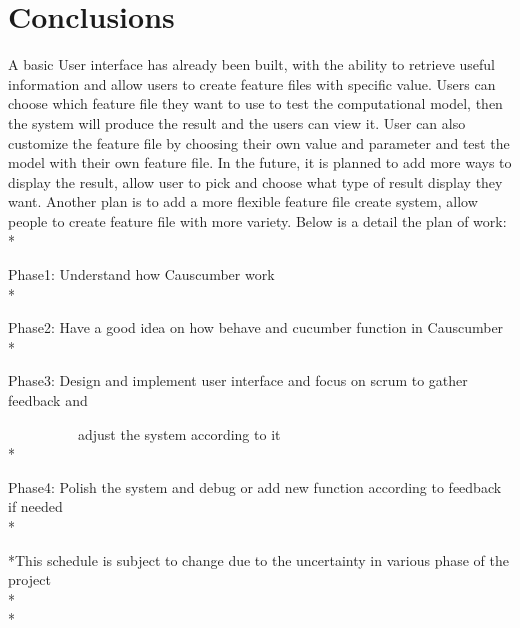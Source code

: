 \chapter{Conclusions}

A basic User interface has already been built, with the ability to retrieve useful information and allow users to create feature files with specific value. Users can choose which feature file they want to use to test the computational model, then the system will produce the result and the users can view it. User can also customize the feature file by choosing their own value and parameter and test the model with their own feature file. In the future, it is planned to add more ways to display the result, allow user to pick and choose what type of result display they want. Another plan is to add a more flexible feature file create system, allow people to create feature file with more variety. Below is a detail the plan of work:\\*

Phase1: Understand how Causcumber work\\*

Phase2: Have a good idea on how behave and cucumber function in Causcumber\\*

Phase3: Design and implement user interface and focus on scrum to gather feedback and \space 

~~~~~~ ~ ~ adjust the system according to it\\*

Phase4: Polish the system and debug or add new function according to feedback if needed\\*

*This schedule is subject to change due to the uncertainty in various phase of the project\\*\\*
